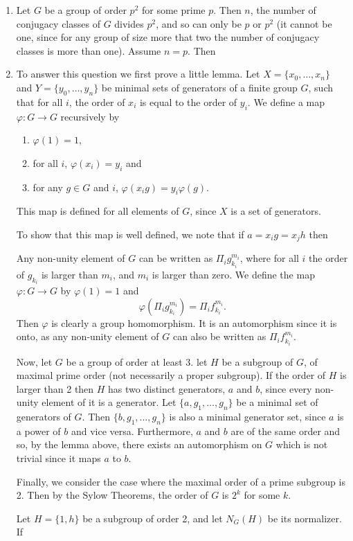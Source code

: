 \documentclass[11pt]{article} \usepackage{amssymb}
\renewcommand{\phi}{\varphi}
\begin{document}
\begin{enumerate}
\item
  Let $G$ be a group of order $p^2$ for some prime $p$. Then $n$, the number of
  conjugacy classes of $G$ divides $p^2$, and so can only be $p$ or
  $p^2$ (it cannot be one, since for any group of size more that two the number
  of conjugacy classes is more than one). Assume $n=p$. Then 

\item
  To answer this question we first prove a little lemma. Let 
  $X=\{x_0,\ldots,x_n\}$ and $Y=\{y_0,\ldots,y_n\}$ be minimal sets of 
  generators of a finite group $G$, such that for all $i$, the order of $x_i$ 
  is equal to the order of $y_i$. We define a map $\phi:G \to G$ recursively 
  by 
  \begin{enumerate}
  \item $\phi(1)=1$,
  \item for all $i$, $\phi(x_i)=y_i$ and
  \item for any $g \in G$ and $i$, $\phi(x_ig)=y_i\phi(g)$.
  \end{enumerate}
  This map is defined for all elements of $G$, since $X$ is a set 
  of generators.

  To show that this map is well defined, we note that if $a=x_ig=x_jh$ then
  



 Any non-unity element of $G$ can be written as
  $\Pi_ig_{k_i}^{m_i}$, where for all $i$ the order of $g_{k_i}$ is larger than
  $m_i$, and $m_i$ is larger than zero. We define the map $\phi:G \to G$ by $\phi(1)=1$ and
  $$\phi(\Pi_ig_{k_i}^{m_i})=\Pi_if_{k_i}^{m_i}.$$
  Then $\phi$ is clearly a group homomorphism. It is an automorphism since it
  is onto, as any non-unity element of $G$ can also be written as 
  $\Pi_if_{k_i}^{m_i}$.

  Now, let $G$ be a group of order at least 3.
  let $H$ be  a subgroup of $G$, of maximal prime order (not necessarily
  a proper subgroup). If the order of $H$ is larger 
  than 2 then $H$ has two distinct generators, $a$ and $b$, since every non-unity
  element of it is a generator. Let 
  $\{a,g_1,\ldots,g_n\}$  be a minimal set of 
  generators of $G$. Then $\{b,g_1,\ldots,g_n\}$ is also a minimal generator set,
  since $a$ is a power of $b$ and vice versa. Furthermore, $a$ and $b$ are of
  the same order and so, by the lemma above, there exists an automorphism
  on $G$ which is not trivial since it maps $a$ to $b$.

  Finally, we consider the case where the maximal order of a prime subgroup
  is 2. Then by the Sylow Theorems, the order of $G$ is $2^k$ for some $k$. 

Let
  $H=\{1,h\}$ be a subgroup of order 2, and let $N_G(H)$ be its normalizer. If 
  
\end{enumerate}
\end{document}
